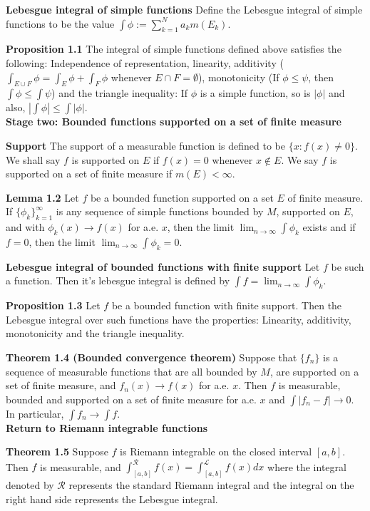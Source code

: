 \documentclass[6pt,landscape]{article}
\begin{document}
\begin{multicols*}{3}
\textbf{Lebesgue integral of simple functions} Define the Lebesgue integral of simple functions to be the value $\int \phi := \sum_{k=1}^N a_km(E_k)$.

\textbf{Proposition 1.1} The integral of simple functions defined above satisfies the following: Independence of representation, linearity, additivity ($\int_{E\cup F} \phi = \int_E \phi + \int_F \phi$
whenever $E\cap F = \emptyset$), monotonicity (If $\phi\leq \psi$, then $\int \phi \leq \int \psi$) and the triangle inequality: If $\phi$ is a simple function, so is $|\phi|$ and also, 
$|\int \phi | \leq \int |\phi|$.\\

\textbf{Stage two: Bounded functions supported on a set of finite measure}

\textbf{Support} The support of a measurable function is defined to be $\{x: f(x)\neq 0\}$. We shall say $f$ is supported on $E$ if $f(x)=0$ whenever $x\not\in E$. We say $f$ is supported
on a set of finite measure if $m(E) <\infty$.

\textbf{Lemma 1.2} Let $f$ be a bounded function supported on a set $E$ of finite measure. If $\{\phi_k\}_{k=1}^{\infty}$ is any sequence of simple functions bounded by $M$,
supported on $E$, and with $\phi_k(x) \to f(x)$ for a.e. $x$, then the limit $\lim_{n\to\infty} \int \phi_k$ exists and if $f=0$, then the limit $\lim_{n\to\infty} \int \phi_k = 0$.

\textbf{Lebesgue integral of bounded functions with finite support} Let $f$ be such a function. Then it's lebesgue integral is defined by $\int f = \lim_{n\to\infty} \int \phi_k$.

\textbf{Proposition 1.3} Let $f$ be a bounded function with finite support. Then the Lebesgue integral over such functions have the properties: Linearity, additivity, monotonicity and
the triangle inequality.

\textbf{Theorem 1.4 (Bounded convergence theorem)} Suppose that $\{f_n\}$ is a sequence of measurable functions that are all bounded by $M$, are supported on a set of finite
measure, and $f_n(x) \to f(x)$ for a.e. $x$. Then $f$ is measurable, bounded and supported on a set of finite measure for a.e. $x$ and $\int |f_n-f| \to 0$. In particular, $\int f_n \to \int f$.\\

\textbf{Return to Riemann integrable functions}

\textbf{Theorem 1.5} Suppose $f$ is Riemann integrable on the closed interval $[a,b]$. Then $f$ is measurable, and $\int_{[a,b]}^{\mathcal{R}} f(x) = \int_{[a,b]}^{\mathcal{L}} f(x)dx$ where the
integral denoted by $\mathcal{R}$ represents the standard Riemann integral and the integral on the right hand side represents the Lebesgue integral.


\end{multicols*}
\end{document}

